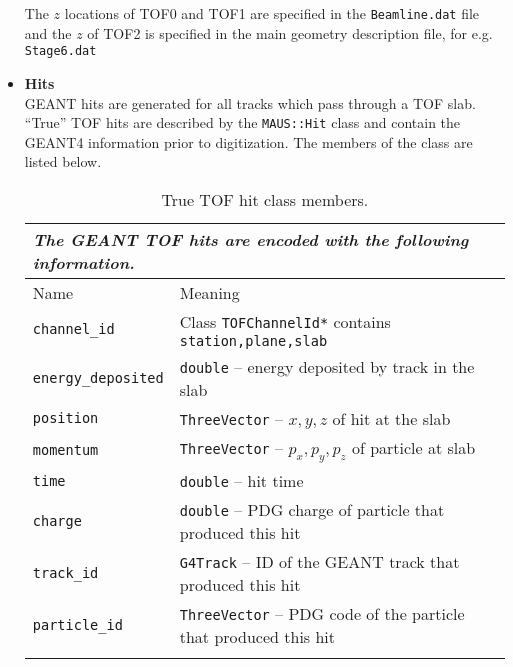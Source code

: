\begin{itemize}
The $z$ locations of TOF0 and TOF1 are specified in the \verb|Beamline.dat| file and the $z$ of TOF2 is specified in the main geometry description file, for e.g. \verb|Stage6.dat|
\item {\bf{Hits}}\\
GEANT hits are generated for all tracks which pass through a TOF slab. 
``True'' TOF hits are described by the \verb|MAUS::Hit| class and contain the GEANT4 information prior to digitization. The members of the class are listed below.
\begin{table*}
\begin{center}
\caption{True TOF hit class members.}
\begin{tabularx}{\linewidth}{lX}
\multicolumn{2}{l}{\emph{The GEANT TOF hits are encoded with the following information.}} \\
\hline
Name & Meaning \\
\hline
\verb|channel_id| & Class \verb|TOFChannelId*| contains \verb|station,plane,slab| \\
\verb|energy_deposited| & \verb|double| -- energy deposited by track in the slab\\
\verb|position| & \verb|ThreeVector| -- $x,y,z$ of hit at the slab\\
\verb|momentum| & \verb|ThreeVector| -- $p_x,p_y,p_z$ of particle at slab\\
\verb|time| & \verb|double| -- hit time\\
\verb|charge| & \verb|double| -- PDG charge of particle that produced this hit\\
\verb|track_id| & \verb|G4Track| -- ID of the GEANT track that produced this hit\\
\verb|particle_id| & \verb|ThreeVector| -- PDG code of the particle that produced this hit\\
\begin{makeimage} %
\end{makeimage} 
\end{tabularx}
\end{center}
\end{table*}




\end{itemize}
